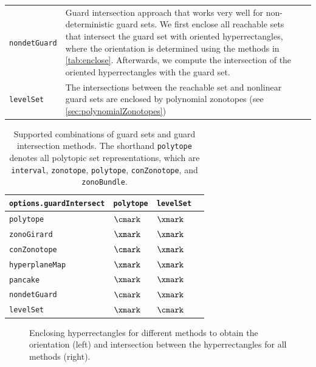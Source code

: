 \begin{table}
\begin{tabular}{l p{10cm} c}
        \texttt{nondetGuard}   & Guard intersection approach that works very well for non-deterministic guard sets. We first enclose all reachable sets that intersect the guard set with oriented hyperrectangles, where the orientation is determined using the methods in \cref{tab:enclose}. Afterwards, we compute the intersection of the oriented hyperrectangles with the guard set. & \\
        \texttt{levelSet}      & The intersections between the reachable set and nonlinear guard sets are enclosed by polynomial zonotopes (see \cref{sec:polynomialZonotopes}) & \cite{Kochdumper2020d} \\
        \bottomrule
    \end{tabular}
\end{table}

\begin{table}
    \centering
    \caption{Supported combinations of guard sets and guard intersection methods. The shorthand \texttt{polytope} denotes all polytopic set representations, which are \texttt{interval}, \texttt{zonotope}, \texttt{polytope}, \texttt{conZonotope}, and \texttt{zonoBundle}.}
    \label{tab:guardSet}
    \begin{tabular}{ p{4.5cm} C{3cm} C{3cm} C{3cm}}
        \toprule
        \texttt{options.guardIntersect} & \texttt{polytope} & \texttt{levelSet} \\ \midrule
        \texttt{polytope}               & $\cmark$          & $\xmark$          \\
        \texttt{zonoGirard}             & $\xmark$          & $\xmark$          \\
        \texttt{conZonotope}            & $\cmark$          & $\xmark$          \\
        \texttt{hyperplaneMap}          & $\xmark$          & $\xmark$          \\
        \texttt{pancake}                & $\xmark$          & $\xmark$          \\
        \texttt{nondetGuard}            & $\cmark$          & $\xmark$          \\
        \texttt{levelSet}               & $\xmark$          & $\cmark$          \\
        \bottomrule
    \end{tabular}
\end{table}

\begin{figure}[htb]
    \centering
    \caption{Enclosing hyperrectangles for different methods to obtain the orientation (left) and intersection between the hyperrectangles for all methods (right).}
    \label{fig:enclose}
\end{figure}

